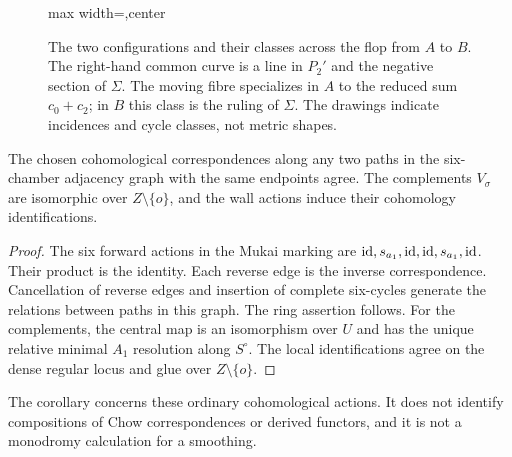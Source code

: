\begin{figure}[htbp]
\centering
\begin{adjustbox}{max width=\textwidth,center}

\end{adjustbox}
\caption{The two configurations and their classes across the flop
from $A$ to $B$. The right-hand common curve is a line in $P_2'$
and the negative section of $\Sigma$. The moving fibre specializes
in $A$ to the reduced sum $c_0+c_2$; in $B$ this class is the
ruling of $\Sigma$. The drawings indicate incidences and cycle
classes, not metric shapes.}
\label{fig:configurations}
\end{figure}

\begin{corollary}\label{cor:gallery}
The chosen cohomological correspondences along any two paths in
the six-chamber adjacency graph with the same endpoints agree.
The complements $V_\sigma$ are isomorphic over $Z\setminus\{o\}$,
and the wall actions induce their cohomology identifications.
\end{corollary}

\begin{proof}
The six forward actions in the Mukai marking are
$\operatorname{id},s_{a_1},\operatorname{id},\operatorname{id},s_{a_1},\operatorname{id}$. Their product is the identity.
Each reverse edge is the inverse correspondence. Cancellation
of reverse edges and insertion of complete six-cycles generate
the relations between paths in this graph. The ring assertion
follows. For the complements, the central map is an isomorphism
over $U$ and has the unique relative minimal $A_1$ resolution
along $S^\circ$. The local identifications agree on the dense
regular locus and glue over $Z\setminus\{o\}$.
\end{proof}

The corollary concerns these ordinary cohomological actions. It
does not identify compositions of Chow correspondences or derived
functors, and it is not a monodromy calculation for a smoothing.
